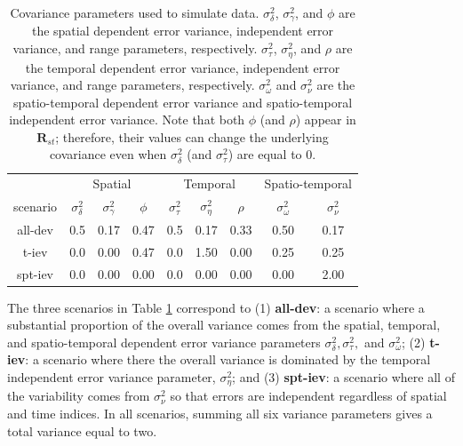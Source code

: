 \documentclass[smallextended]{svjour3}       %
\begin{document}
\begin{table}[H]

\caption{\label{tab:simparmtab}Covariance parameters used to simulate data. $\sigma^2_{\delta}$, $\sigma^2_{\gamma}$, and $\phi$ are the spatial dependent error variance, independent error variance, and range parameters, respectively. $\sigma^2_{\tau}$, $\sigma^2_{\eta}$, and $\rho$ are the temporal dependent error variance, independent error variance, and range parameters, respectively. $\sigma^2_{\omega}$ and $\sigma^2_{\nu}$ are the spatio-temporal dependent error variance and spatio-temporal independent error variance. Note that both $\phi$ (and $\rho$) appear in $\mathbf{R}_{st}$; therefore, their values can change the underlying covariance even when $\sigma^2_{\delta}$ (and $\sigma^2_{\tau}$) are equal to 0.}
\centering
\begin{tabular}[t]{ccccccccc}
\toprule
\multicolumn{1}{c}{ } & \multicolumn{3}{c}{Spatial} & \multicolumn{3}{c}{Temporal} & \multicolumn{2}{c}{Spatio-temporal} \\
\cmidrule(l{3pt}r{3pt}){2-4} \cmidrule(l{3pt}r{3pt}){5-7} \cmidrule(l{3pt}r{3pt}){8-9}
scenario & $\sigma^2_{\delta}$ & $\sigma^2_{\gamma}$ & $\phi$ & $\sigma^2_{\tau}$ & $\sigma^2_{\eta}$ & $\rho$ & $\sigma^2_{\omega}$ & $\sigma^2_{\nu}$\\
\midrule
all-dev & 0.5 & 0.17 & 0.47 & 0.5 & 0.17 & 0.33 & 0.50 & 0.17\\
t-iev & 0.0 & 0.00 & 0.47 & 0.0 & 1.50 & 0.00 & 0.25 & 0.25\\
spt-iev & 0.0 & 0.00 & 0.00 & 0.0 & 0.00 & 0.00 & 0.00 & 2.00\\
\bottomrule
\end{tabular}
\end{table}

The three scenarios in Table \ref{tab:simparmtab} correspond to (1)
\textbf{all-dev}: a scenario where a substantial proportion of the
overall variance comes from the spatial, temporal, and spatio-temporal
dependent error variance parameters
\(\sigma^2_{\delta}, \sigma^2_{\tau},\) and \(\sigma^2_{\omega}\); (2)
\textbf{t-iev}: a scenario where there the overall variance is dominated
by the temporal independent error variance parameter,
\(\sigma^2_{\eta}\); and (3) \textbf{spt-iev}: a scenario where all of
the variability comes from \(\sigma^2_{\nu}\) so that errors are
independent regardless of spatial and time indices. In all scenarios,
summing all six variance parameters gives a total variance equal to two.
\end{document}
